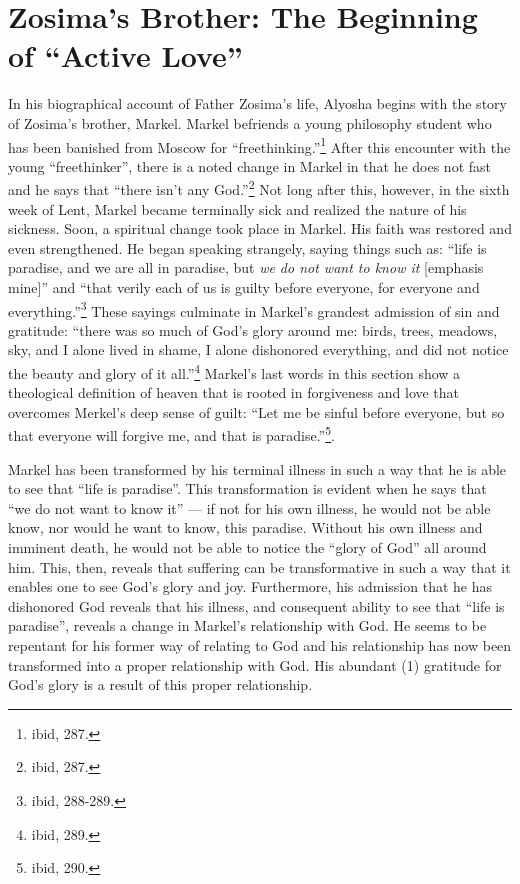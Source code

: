     \section{Zosima's Brother: The Beginning of ``Active Love''}
    
    In his biographical account of Father Zosima's life, Alyosha begins with the story of Zosima's brother, Markel. Markel befriends a young philosophy student who has been banished from Moscow for ``freethinking.''\footnote{ibid, 287.} After this encounter with the young ``freethinker'', there is a noted change in Markel in that he does not fast and he says that ``there isn't any God.''\footnote{ibid, 287.} Not long after this, however, in the sixth week of Lent, Markel became terminally sick and realized the nature of his sickness. Soon, a spiritual change took place in Markel. His faith was restored and even strengthened. He began speaking strangely, saying things such as: ``life is paradise, and we are all in paradise, but \emph{we do not want to know it} [emphasis mine]'' and ``that verily each of us is guilty before everyone, for everyone and everything.''\footnote{ibid, 288-289.} These sayings culminate in Markel's grandest admission of sin and gratitude: ``there was so much of God's glory around me: birds, trees, meadows, sky, and I alone lived in shame, I alone dishonored everything, and did not notice the beauty and glory of it all.''\footnote{ibid, 289.} Markel's last words in this section show a theological definition of heaven that is rooted in forgiveness and love that overcomes Merkel's deep sense of guilt: ``Let me be sinful before everyone, but so that everyone will forgive me, and that is paradise.''\footnote{ibid, 290.}.
    
    Markel has been transformed by his terminal illness in such a way that he is able to see that ``life is paradise''. This transformation is evident when he says that ``we do not want to know it'' --- if not for his own illness, he would not be able know, nor would he want to know, this paradise. Without his own illness and imminent death, he would not be able to notice the ``glory of God'' all around him. This, then, reveals that suffering can be transformative in such a way that it enables one to see God's glory and joy. Furthermore, his admission that he has dishonored God reveals that his illness, and consequent ability to see that ``life is paradise'', reveals a change in Markel's relationship with God. He seems to be repentant for his former way of relating to God and his relationship has now been transformed into a proper relationship with God. His abundant (1) gratitude for God's glory is a result of this proper relationship.
    
